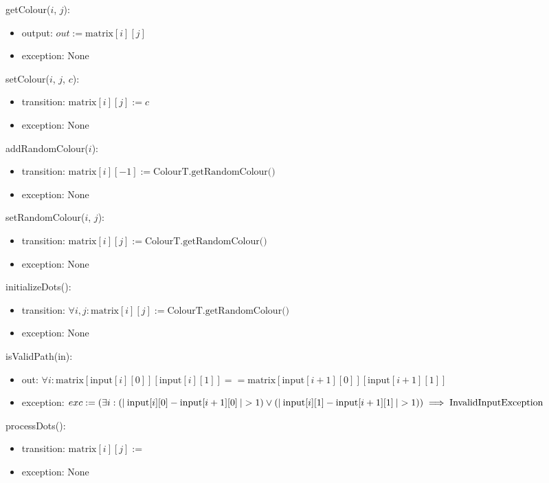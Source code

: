\documentclass[12pt]{article}
\begin{document}
\noindent getColour($i$, $j$):
\begin{itemize}
\item output: $out := \mbox{matrix}[i][j]$
\item exception: None
\end{itemize}

\noindent setColour($i$, $j$, $c$):
\begin{itemize}
\item transition: $\mbox{matrix}[i][j] := c$
\item exception: None
\end{itemize}

\noindent addRandomColour($i$):
\begin{itemize}
\item transition: $\mbox{matrix}[i][-1] :=  \mbox{ColourT.getRandomColour()}$  
\item exception: None
\end{itemize}

\noindent setRandomColour($i$, $j$):
\begin{itemize}
\item transition: $\mbox{matrix}[i][j] := \mbox{ColourT.getRandomColour()}$
\item exception: None
\end{itemize}

\noindent initializeDots():
\begin{itemize}
\item transition: $\forall i, j: \mbox{matrix}[i][j] := \mbox{ColourT.getRandomColour()} $
\item exception: None
\end{itemize}

\noindent isValidPath(in):
\begin{itemize}
\item out: $\forall i: \mbox{matrix}[\mbox{input}[i][0]] [\mbox{input}[i][1]] == \mbox{matrix}[\mbox{input}[i+1][0]] [\mbox{input}[i+1][1]] $
\item exception: $exc := (\exists i: (|\:\mbox{input}[i][0] - \mbox{input}[i+1][0]\:| > 1) \lor (|\:\mbox{input}[i][1] - \\ \mbox{input}[i+1][1] \:| > 1)) \implies \mbox{InvalidInputException}$
\end{itemize}

\noindent processDots():
\begin{itemize}
\item transition: $\mbox{matrix}[i][j] := $
\item exception: None
\end{itemize}
\end{document}
